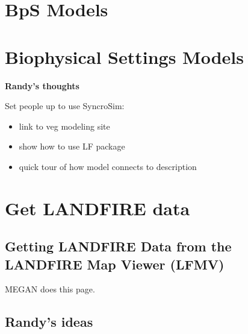 \documentclass[
  letterpaper,
  DIV=11,
  numbers=noendperiod]{scrreprt}
\providecommand{\tightlist}{%
  \setlength{\itemsep}{0pt}\setlength{\parskip}{0pt}}\usepackage{longtable,booktabs,array}
\begin{document}

\hypertarget{bps-models}{%
\chapter{BpS Models}\label{bps-models}}


\hypertarget{biophysical-settings-models}{%
\chapter{Biophysical Settings
Models}\label{biophysical-settings-models}}

\textbf{Randy's thoughts}

Set people up to use SyncroSim:

\begin{itemize}
\tightlist
\item
  link to veg modeling site
\item
  show how to use LF package
\item
  quick tour of how model connects to description
\end{itemize}


\hypertarget{get-landfire-data}{%
\chapter{Get LANDFIRE data}\label{get-landfire-data}}

\hypertarget{getting-landfire-data-from-the-landfire-map-viewer-lfmv}{%
\section{Getting LANDFIRE Data from the LANDFIRE Map Viewer
(LFMV)}\label{getting-landfire-data-from-the-landfire-map-viewer-lfmv}}

MEGAN does this page.

\hypertarget{randys-ideas}{%
\section{Randy's ideas}\label{randys-ideas}}
\end{document}
